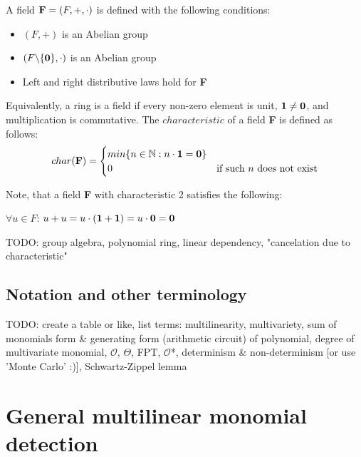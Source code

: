A field $\textbf F = (F, +, \cdot)$ is defined with the following conditions:
\begin{itemize}
  \item $(F, +)$ is an Abelian group
  \item $(F\backslash \{\textbf 0\}, \cdot )$ is an Abelian group
  \item Left and right distributive laws hold for \textbf F
\end{itemize}

Equivalently, a ring is a field if every non-zero element is unit, $\textbf 1 \neq \textbf 0$, and multiplication is commutative. 
The $characteristic$ of a field \textbf F is defined as follows:
\begin{equation}
  char(\textbf F) =
    \begin{cases}
      min\{n \in \mathbb N : n \cdot \textbf 1 = \textbf 0 \}\\
      0 & \text{if such $n$ does not exist}\\
    \end{cases}       
\end{equation}


Note, that a field \textbf F with 
characteristic 2 satisfies the following:
\begin{center}
  $\forall u \in F$: $u + u = u \cdot (\textbf 1 + \textbf 1) = u \cdot \textbf 0 = \textbf 0$
\end{center}

TODO: group algebra, polynomial ring, linear dependency, "cancelation due to characteristic"\nl

\subsection{Notation and other terminology} %
\label{sect:prelims_other}

TODO: create a table or like, list terms: 
multilinearity, multivariety, sum of monomials form \& generating form (arithmetic circuit) of polynomial, 
degree of multivariate monomial, $\mathcal{O}$, $\Theta$, FPT, $\mathcal{O}$*, determinism \& non-determinism [or use 'Monte Carlo' :)], 
Schwartz-Zippel lemma


\section{General multilinear monomial detection}

